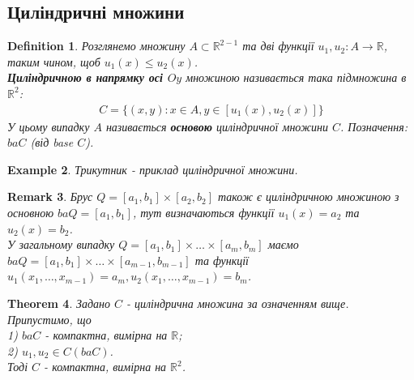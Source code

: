 \documentclass[a4paper, 10pt]{article}
\theoremstyle{theoremdd}
\newtheorem{theorem}{Theorem}[subsection]
\theoremstyle{theoremdd}
\newtheorem{definition}[theorem]{Definition}
\theoremstyle{theoremdd}
\theoremstyle{theoremdd}
\newtheorem{example}[theorem]{Example}
\theoremstyle{theoremdd}
\theoremstyle{theoremdd}
\newtheorem{remark}[theorem]{Remark}
\theoremstyle{theoremdd}
\theoremstyle{theoremdd}
\begin{document}
\subsection{Циліндричні множини}
\begin{definition}
Розглянемо множину $A \subset \mathbb{R}^{2-1}$ та дві функції $u_1,u_2: A \to \mathbb{R}$, таким чином, щоб $u_1(x) \leq u_2(x)$.\\
\textbf{Циліндричною в напрямку осі $Oy$} множиною називається така підмножина в $\mathbb{R}^2$:
\begin{align*}
C = \{ (x,y): x \in A, y \in [u_1(x),u_2(x)] \}
\end{align*}
У цьому випадку $A$ називається \textbf{основою} циліндричної множини $C$. Позначення: $ba C$ (від base $C$).
\begin{figure}[H]
\centering
{}
\end{figure}
\end{definition}

\begin{example}
Трикутник - приклад циліндричної множини.
\end{example}

\begin{remark}
Брус $Q = [a_1,b_1] \times [a_2,b_2]$ також є циліндричною множиною з основною $baQ = [a_1,b_1]$, тут визначаються функції $u_1(x) = a_2$ та $u_2(x) = b_2$.\\
У загальному випадку $Q = [a_1,b_1] \times \dots \times [a_m,b_m]$ маємо $baQ = [a_1,b_1] \times \dots \times [a_{m-1},b_{m-1}]$ та функції $u_1(x_1,\dots,x_{m-1}) = a_m, u_2(x_1,\dots,x_{m-1}) = b_m$.
\end{remark}

\begin{theorem}
Задано $C$ - циліндрична множина за означенням вище. Припустимо, що\\
1) $ba C$ - компактна, вимірна на $\mathbb{R}$;\\
2) $u_1,u_2 \in C(ba C)$.\\
Тоді $C$ - компактна, вимірна на $\mathbb{R}^2$.
\end{theorem}
\end{document}
